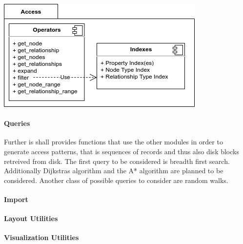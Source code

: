                 \includegraphics[keepaspectratio, width=\textwidth]{img/access_arch.png} \\


			
			\paragraph{Queries}
                Further is shall provides functions that use the other modules in order to generate access patterns, that is sequences of records and thus also disk blocks retreived from disk.
                The first query to be considered is breadth first search. Additionally Dijkstras algorithm and the A* algorithm are planned to be considered. Another class of possible queries to consider are random walks.

				
			\paragraph{Import}
				
			\paragraph{Layout Utilities}
			
			\paragraph{Visualization Utilities}
			
